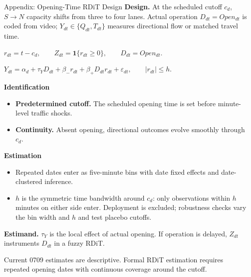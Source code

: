 \documentclass[11pt,aspectratio=169]{beamer}
\begin{document}
\begin{frame}[label=appvideordit]{Appendix: Opening-Time RDiT Design}
\vspace{-0.48em}
\small
\textbf{Design.}
At the scheduled cutoff $c_d$, $S\to N$ capacity shifts from three to four lanes. Actual operation $D_{dt}=Open_{dt}$ is coded from video; $Y_{dt}\in\{Q_{dt},T_{dt}\}$ measures directional flow or matched travel time.

\vspace{0.10em}
{\centering
$\displaystyle r_{dt}=t-c_d,\qquad
Z_{dt}=\mathbf{1}\{r_{dt}\geq0\},\qquad
D_{dt}=Open_{dt}. $\par}

\vspace{0.16em}
{\centering
$\displaystyle
Y_{dt}=\alpha_d+\tau_YD_{dt}
+\beta_-r_{dt}+\beta_+D_{dt}r_{dt}+\varepsilon_{dt},
\qquad |r_{dt}|\leq h.$\par}

\vspace{0.16em}
\textbf{Identification}\par
\begin{itemize}\footnotesize\setlength\itemsep{0em}
  \item \textbf{Predetermined cutoff.} The scheduled opening time is set before minute-level traffic shocks.
  \item \textbf{Continuity.} Absent opening, directional outcomes evolve smoothly through $c_d$.
\end{itemize}
\vspace{-0.05em}
\textbf{Estimation}\par
\begin{itemize}\footnotesize\setlength\itemsep{0em}
  \item Repeated dates enter as five-minute bins with date fixed effects and date-clustered inference.
  \item $h$ is the symmetric time bandwidth around $c_d$: only observations within $h$ minutes on either side enter. Deployment is excluded; robustness checks vary the bin width and $h$ and test placebo cutoffs.
\end{itemize}

\vspace{0em}
{\footnotesize\textbf{Estimand.} $\tau_Y$ is the local effect of actual opening. If operation is delayed, $Z_{dt}$ instruments $D_{dt}$ in a fuzzy RDiT.}

\vfill
{\tiny\color{gray!75!black} Current 0709 estimates are descriptive. Formal RDiT estimation requires repeated opening dates with continuous coverage around the cutoff.}

\par\vspace{0.18em}\noindent\hfill
\hyperlink{appvideofacts}{}\;
\hyperlink{nextsteps}{}
\end{frame}

\end{document}
